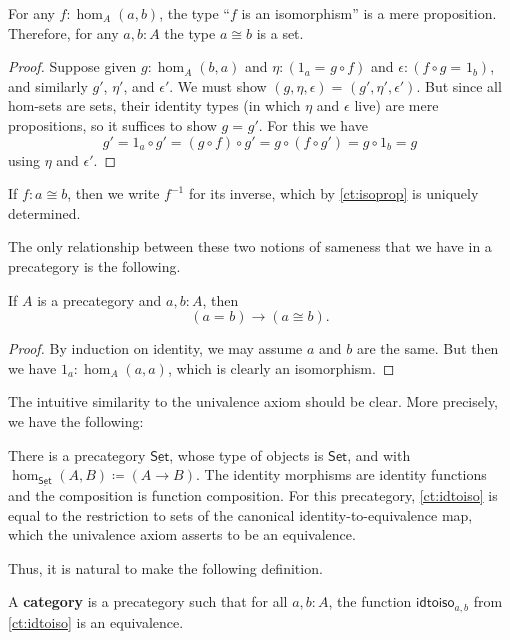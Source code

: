 \documentclass{mscs}
\newcommand{\defeq}{\coloneqq}  %
\newcommand{\id}[3][]{\ensuremath{#2 =_{#1} #3}\xspace}
\renewcommand{\set}{\ensuremath{\mathsf{Set}}\xspace}
\newcommand{\uset}{\ensuremath{\underline{\set}}\xspace}
\numberwithin{equation}{section}
\newcommand{\inv}[1]{{#1}^{-1}}
\newcommand{\idtoiso}{\ensuremath{\mathsf{idtoiso}}\xspace}
\begin{document}
\begin{lem}\label{ct:isoprop}
  For any $f:\hom_A(a,b)$, the type ``$f$ is an isomorphism'' is a mere proposition.
  Therefore, for any $a,b:A$ the type $a\cong b$ is a set.
\end{lem}
\begin{proof}
  Suppose given $g:\hom_A(b,a)$ and $\eta:(\id{1_a}{g\circ f})$ and $\epsilon:(\id{f\circ g}{1_b})$, and similarly $g'$, $\eta'$, and $\epsilon'$.
We must show $\id{(g,\eta,\epsilon)}{(g',\eta',\epsilon')}$.
  But since all hom-sets are sets, their identity types (in which $\eta$ and $\epsilon$ live) are mere propositions, so it suffices to show $\id g {g'}$.
  For this we have
  \[g' = 1_a\circ g' = (g\circ f)\circ g' = g\circ (f\circ g') = g\circ 1_b = g\]
  using $\eta$ and $\epsilon'$.
\end{proof}

If $f:a\cong b$, then we write $\inv f$ for its inverse, which by \autoref{ct:isoprop} is uniquely determined.

The only relationship between these two notions of sameness that we have in a precategory is the following.

\begin{lem}\label{ct:idtoiso}
  If $A$ is a precategory and $a,b:A$, then
  \[(\id a b)\to (a \cong b).\]
\end{lem}
\begin{proof}
  By induction on identity, we may assume $a$ and $b$ are the same.
  But then we have $1_a:\hom_A(a,a)$, which is clearly an isomorphism.
\end{proof}

The intuitive similarity to the univalence axiom should be clear.
More precisely, we have the following:

\begin{eg}\label{ct:precatset}
  There is a precategory \uset, whose type of objects is \set, and with $\hom_{\uset}(A,B) \defeq (A\to B)$.
  The identity morphisms are identity functions and the composition is function composition.
  For this precategory, \autoref{ct:idtoiso} is equal to the restriction to sets of the canonical identity-to-equivalence map, which the univalence axiom asserts to be an equivalence.
\end{eg}

Thus, it is natural to make the following definition.

\begin{defn}\label{ct:category}
  A \textbf{category} is a precategory such that for all $a,b:A$, the function $\idtoiso_{a,b}$ from \autoref{ct:idtoiso} is an equivalence.
\end{defn}
\end{document}
